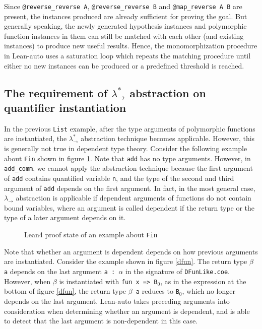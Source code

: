 Since \texttt{@reverse\_reverse A}, \texttt{@reverse\_reverse B} and \texttt{@map\_reverse A B}
are present, the instances produced are already sufficient for proving the goal.
But generally speaking, the newly generated hypothesis instances and polymorphic function instances
in them can still be matched with each other (and existing instances) to produce new useful results.
Hence, the monomorphization procedure in Lean-auto uses a saturation loop which
repeats the matching procedure until either no new instances can be produced or a predefined
threshold is reached.

\subsection{The requirement of $\lambda_\to^*$ abstraction on quantifier instantiation} \label{exqdet}

In the previous \texttt{List} example, after the type arguments of polymorphic functions
are instantiated, the $\lambda_\to^*$ abstraction technique becomes applicable. However, this is
generally not true in dependent type theory. Consider the following example about \texttt{Fin} shown
in figure \ref{leanfinexplicit}. Note that \texttt{add} has no type arguments. However, in
\texttt{add\_comm}, we cannot apply the abstraction technique because the first argument of
\texttt{add} contains quantified variable \texttt{n}, and the type of the second and third argument
of \texttt{add} depends on the first argument. In fact, in the most general case, $\lambda_\to$
abstraction is applicable if dependent arguments of functions do not contain bound variables,
where an argument is called dependent if the return type or the type of a later argument depends on it.

\begin{figure}
  \begin{CenteredBox}
    
  \end{CenteredBox}
  \caption{Lean4 proof state of an example about \texttt{Fin}}
  \label{leanfinexplicit}
\end{figure}

Note that whether an argument is dependent depends on how previous arguments
are instantiated. Consider the example shown in figure \ref{dfun}. The return
type \texttt{$\beta$ a} depends on the last argument \texttt{a : $\alpha$} in the signature of
\texttt{DFunLike.coe}. However, when $\beta$ is instantiated with \texttt{fun x => B$_0$}, as in the
expression at the bottom of figure \ref{dfun}, the return type \texttt{$\beta$ a} reduces to \texttt{B$_0$},
which no longer depends on the last argument. Lean-auto takes preceding arguments into
consideration when determining whether an argument is dependent, and is able to detect
that the last argument is non-dependent in this case.

